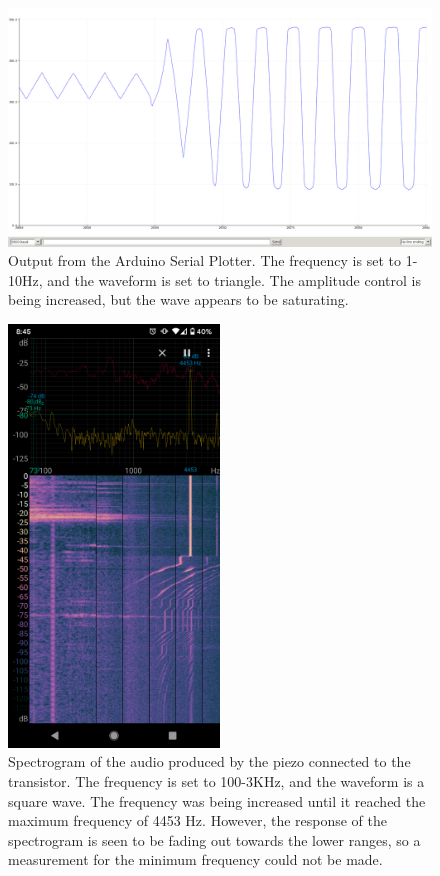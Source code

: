 \documentclass[12pt]{article}
\begin{document}
\begin{figure}[H]	
    \centering
    \includegraphics[width=\textwidth]{screenshot_4.png} 
    \caption{Output from the Arduino Serial Plotter. The frequency is set to 1-10Hz, and the waveform is set to
    triangle. The amplitude control is being increased, but the wave appears to be saturating.}
    \label{fig:plotamp}
\end{figure}

\begin{figure}[H]	
    \centering
    \includegraphics[width=0.5\textwidth]{spec1.png} 
    \caption{Spectrogram of the audio produced by the piezo connected to the transistor. The frequency is 
    set to 100-3KHz, and the waveform is a square wave. The frequency was being increased until it reached
    the maximum frequency of 4453 Hz. However, the response of the spectrogram is seen to be fading out 
    towards the lower ranges, so a measurement for the minimum frequency could not be made.}
    \label{fig:speca}
\end{figure}
\end{document}
